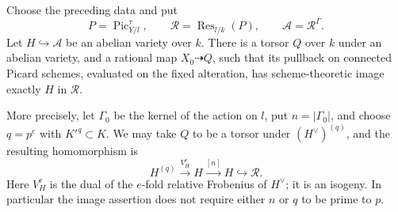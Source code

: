 \begin{lemma}
\label{B:invariant-abelian-realization}
Choose the preceding data and put
\[
 P=\operatorname{Pic}^{\tau}_{Y/l},\qquad
 \mathcal R=\operatorname{Res}_{l/k}(P),\qquad
 \mathcal A=\mathcal R^\Gamma.
\]
Let $H\hookrightarrow\mathcal A$ be an abelian variety over
$k$.  There is a torsor $Q$ over $k$ under an abelian variety,
and a rational map $X_0\dashrightarrow Q$, such that its
pullback on connected Picard schemes, evaluated on the fixed
alteration, has scheme-theoretic image exactly $H$ in
$\mathcal R$.

More precisely, let $\Gamma_0$ be the kernel of the action on
$l$, put $n=|\Gamma_0|$, and choose $q=p^e$ with $K'^q\subset K$.
We may take $Q$ to be a torsor under $(H^\vee)^{(q)}$, and the
resulting homomorphism is
\[
 H^{(q)}\xrightarrow{V_H^e}H\xrightarrow{[n]}H
       \hookrightarrow\mathcal R.                 \tag{B.R.1}
\]
Here $V_H^e$ is the dual of the $e$-fold relative Frobenius of
$H^\vee$; it is an isogeny.  In particular the image assertion
does not require either $n$ or $q$ to be prime to $p$.
\end{lemma}
